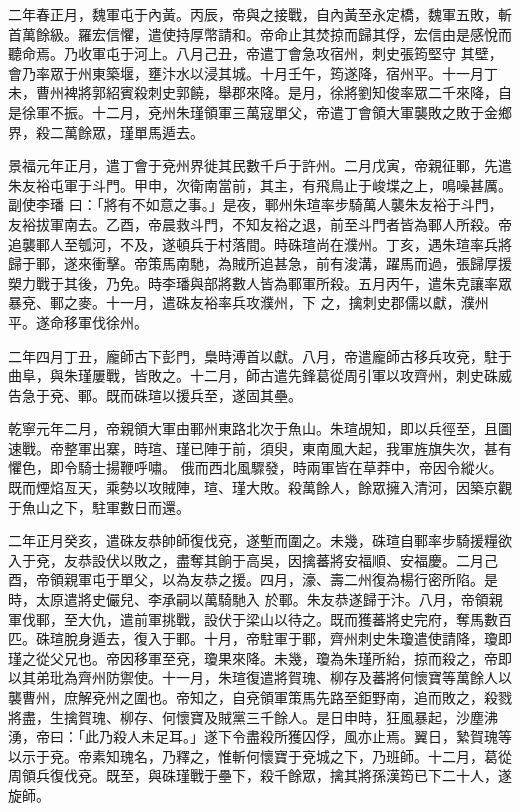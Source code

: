 \begin{pinyinscope}
 二年春正月，魏軍屯于內黃。丙辰，帝與之接戰，自內黃至永定橋，魏軍五敗，斬首萬餘級。羅宏信懼，遣使持厚幣請和。帝命止其焚掠而歸其俘，宏信由是感悅而聽命焉。乃收軍屯于河上。八月己丑，帝遣丁會急攻宿州，刺史張筠堅守
 其壁，會乃率眾于州東築堰，壅汴水以浸其城。十月壬午，筠遂降，宿州平。十一月丁未，曹州裨將郭紹賓殺刺史郭饒，舉郡來降。是月，徐將劉知俊率眾二千來降，自是徐軍不振。十二月，兗州朱瑾領軍三萬寇單父，帝遣丁會領大軍襲敗之敗于金鄉界，殺二萬餘眾，瑾單馬遁去。



 景福元年正月，遣丁會于兗州界徙其民數千戶于許州。二月戊寅，帝親征鄆，先遣朱友裕屯軍于斗門。甲申，次衛南當前，其主，有飛鳥止于峻堞之上，鳴噪甚厲。副使李璠
 曰：「將有不如意之事。」是夜，鄆州朱瑄率步騎萬人襲朱友裕于斗門，友裕拔軍南去。乙酉，帝晨救斗門，不知友裕之退，前至斗門者皆為鄆人所殺。帝追襲鄆人至瓠河，不及，遂頓兵于村落間。時硃瑄尚在濮州。丁亥，遇朱瑄率兵將歸于鄆，遂來衝擊。帝策馬南馳，為賊所追甚急，前有浚溝，躍馬而過，張歸厚援槊力戰于其後，乃免。時李璠與部將數人皆為鄆軍所殺。五月丙午，遣朱克讓率眾暴兗、鄆之麥。十一月，遣硃友裕率兵攻濮州，下
 之，擒刺史郡儒以獻，濮州平。遂命移軍伐徐州。



 二年四月丁丑，龐師古下彭門，梟時溥首以獻。八月，帝遣龐師古移兵攻兗，駐于曲阜，與朱瑾屢戰，皆敗之。十二月，師古遣先鋒葛從周引軍以攻齊州，刺史硃威告急于兗、鄆。既而硃瑄以援兵至，遂固其壘。



 乾寧元年二月，帝親領大軍由鄆州東路北次于魚山。朱瑄覘知，即以兵徑至，且圖速戰。帝整軍出寨，時瑄、瑾已陣于前，須臾，東南風大起，我軍旌旗失次，甚有懼色，即令騎士揚鞭呼嘯。
 俄而西北風驟發，時兩軍皆在草莽中，帝因令縱火。既而煙焰亙天，乘勢以攻賊陣，瑄、瑾大敗。殺萬餘人，餘眾擁入清河，因築京觀于魚山之下，駐軍數日而還。



 二年正月癸亥，遣硃友恭帥師復伐兗，遂塹而圍之。未幾，硃瑄自鄆率步騎援糧欲入于兗，友恭設伏以敗之，盡奪其餉于高吳，因擒蕃將安福順、安福慶。二月己酉，帝領親軍屯于單父，以為友恭之援。四月，濠、壽二州復為楊行密所陷。是時，太原遣將史儼兒、李承嗣以萬騎馳入
 於鄆。朱友恭遂歸于汴。八月，帝領親軍伐鄆，至大仇，遣前軍挑戰，設伏于梁山以待之。既而獲蕃將史完府，奪馬數百匹。硃瑄脫身遁去，復入于鄆。十月，帝駐軍于鄆，齊州刺史朱瓊遣使請降，瓊即瑾之從父兄也。帝因移軍至兗，瓊果來降。未幾，瓊為朱瑾所紿，掠而殺之，帝即以其弟玭為齊州防禦使。十一月，朱瑄復遣將賀瑰、柳存及蕃將何懷寶等萬餘人以襲曹州，庶解兗州之圍也。帝知之，自兗領軍策馬先路至鉅野南，追而敗之，殺戮
 將盡，生擒賀瑰、柳存、何懷寶及賊黨三千餘人。是日申時，狂風暴起，沙塵沸湧，帝曰：「此乃殺人未足耳。」遂下令盡殺所獲囚俘，風亦止焉。翼日，縶賀瑰等以示于兗。帝素知瑰名，乃釋之，惟斬何懷寶于兗城之下，乃班師。十二月，葛從周領兵復伐兗。既至，與硃瑾戰于壘下，殺千餘眾，擒其將孫漢筠已下二十人，遂旋師。




\end{pinyinscope}
